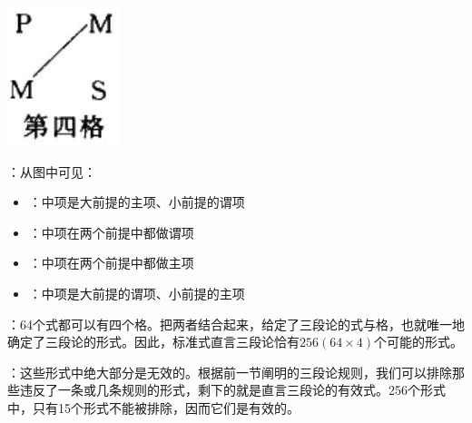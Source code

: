 \begin{center}
\includegraphics[width=\textwidth]{images/2025_05_15_6a28331d5e7c993ad07ag-288(1).jpg}
\end{center}

：从图中可见：

\begin{itemize}
  \item {}：中项是大前提的主项、小前提的谓项
  \item {}：中项在两个前提中都做谓项
  \item {}：中项在两个前提中都做主项
  \item {}：中项是大前提的谓项、小前提的主项
\end{itemize}

：64个式都可以有四个格。把两者结合起来，给定了三段论的式与格，也就唯一地确定了三段论的形式。因此，标准式直言三段论恰有$256(64 \times 4)$个可能的形式。

：这些形式中绝大部分是无效的。根据前一节阐明的三段论规则，我们可以排除那些违反了一条或几条规则的形式，剩下的就是直言三段论的有效式。256个形式中，只有15个形式不能被排除，因而它们是有效的。\cite{patzig1968}

